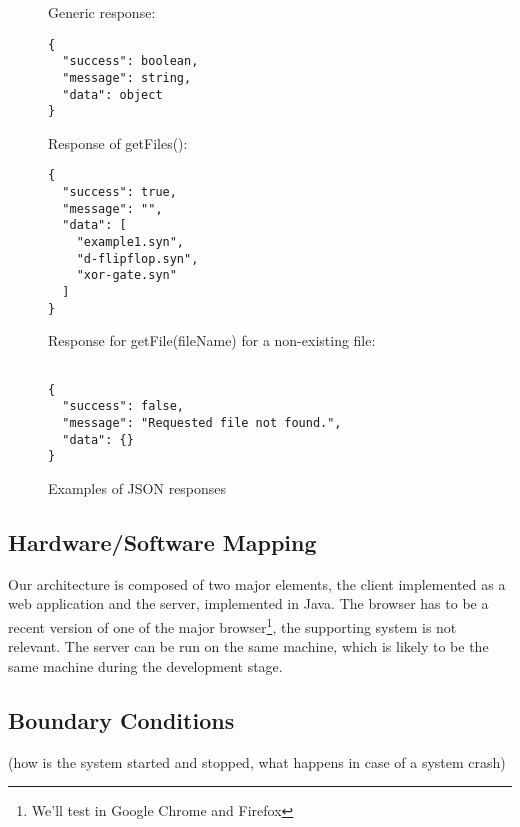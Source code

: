 \documentclass[a4paper]{article}
\begin{document}
\begin{figure}[h!]
\caption{Examples of JSON responses}
Generic response:
\begin{verbatim}
{
  "success": boolean,
  "message": string,
  "data": object
}
\end{verbatim}
Response of getFiles(): \begin{verbatim}
{
  "success": true,
  "message": "",
  "data": [
    "example1.syn",
    "d-flipflop.syn",
    "xor-gate.syn"
  ]
}
\end{verbatim}
Response for getFile(fileName) for a non-existing file:
\begin{verbatim}

{
  "success": false,
  "message": "Requested file not found.",
  "data": {}
}
\end{verbatim}
\end{figure}

\subsection{Hardware/Software Mapping}
Our architecture is composed of two major elements, the client implemented as a web application and the server, implemented in Java. The browser has to be a recent version of one of the major browser\footnote{We'll test in Google Chrome and Firefox}, the supporting system is not relevant. The server can be run on the same machine, which is likely to be the same machine during the development stage.



\subsection{Boundary Conditions}
(how is the system started and stopped, what happens
in case of a system crash)
\end{document}
